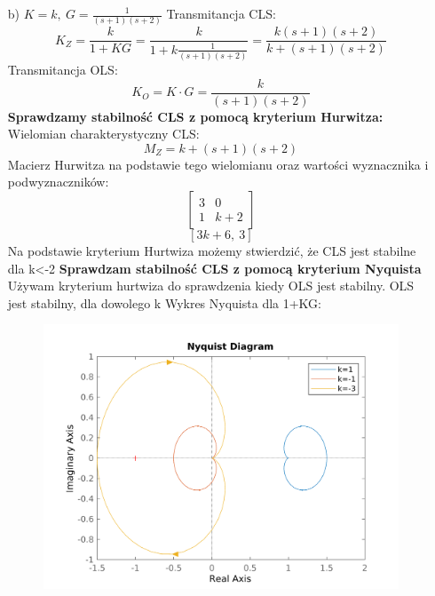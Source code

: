 \documentclass{article}
\begin{document}
\begin{itemize}
    \item[b)] $K=k, \ G=\frac{1}{\left(s + 1\right) \left(s + 2\right)}$
    Transmitancja CLS:
    $$K_Z=\frac{k}{1+KG}=\frac{k}{1+k\frac{1}{\left(s + 1\right) \left(s + 2\right)}}=\frac{k \left(s + 1\right) \left(s + 2\right)}{k + \left(s + 1\right) \left(s + 2\right)}$$
    Transmitancja OLS:
    $$K_O=K\cdot G=\frac{k}{\left(s + 1\right) \left(s + 2\right)}$$
    \textbf{Sprawdzamy stabilność CLS z pomocą kryterium Hurwitza:}\newline
    Wielomian charakterystyczny CLS:
    $$M_Z=k + \left(s + 1\right) \left(s + 2\right)$$
    Macierz Hurwitza na podstawie tego wielomianu oraz wartości wyznacznika i podwyznaczników:
    $$\left[\begin{matrix}3 & 0\\1 & k + 2\end{matrix}\right]$$
    $$\left[ 3 k + 6, \  3\right]$$
    Na podstawie kryterium Hurtwiza możemy stwierdzić, że CLS jest stabilne dla k<-2
    \newline\textbf{Sprawdzam stabilność CLS z pomocą kryterium Nyquista}\newline
    Używam kryterium hurtwiza do sprawdzenia kiedy OLS jest stabilny. OLS jest stabilny, dla dowolego k
    Wykres Nyquista dla 1+KG:
    \begin{figure}
        \includegraphics[scale=0.8]{b.png}
        \centering
    \end{figure}
    \newpage            
    

\end{itemize}
\end{document}
